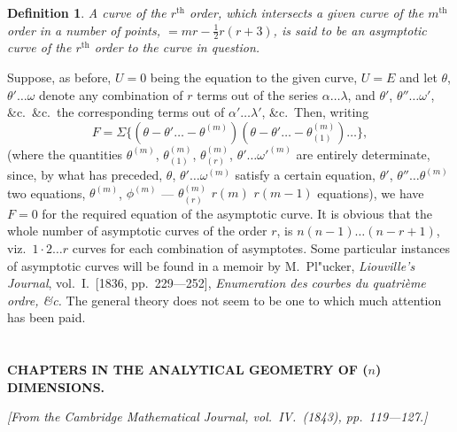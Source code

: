 \documentclass[11pt,a4paper]{book}
\newtheorem*{definition}{Definition}
\begin{document}
\begin{definition}
A curve of the $r^{\text{th}}$ order, which intersects a given curve of the
$m^{\text{th}}$ order in a number of points, $= mr - \tfrac{1}{2}r(r+3)$, is said to be an \textit{asymptotic curve}
of the $r^{\text{th}}$ order to the curve in question.
\end{definition}

Suppose, as before, $U=0$ being the equation to the given curve, $U=E$ and let
$\theta$, $\theta' \ldots \omega$ denote any combination of $r$ terms out of the series $\alpha \ldots \lambda$, and $\theta'$, $\theta'' \ldots \omega'$,
\&c.\ \&c.\ the corresponding terms out of $\alpha' \ldots \lambda'$, \&c.\ Then, writing
\[
F = \Sigma\{(\theta - \theta' \ldots - \theta^{(m)})(\theta - \theta' \ldots - \theta^{(m)}_{(1)}) \ldots\},
\]
(where the quantities $\theta^{(m)}$, $\theta^{(m)}_{(1)}$, $\theta^{(m)}_{(r)}$, $\theta' \ldots \omega'^{(m)}$ are entirely determinate, since, by
what has preceded, $\theta$, $\theta' \ldots \omega^{(m)}$ satisfy a certain equation, $\theta'$, $\theta'' \ldots \theta^{(m)}$ two equations,
$\theta^{(m)}$, $\phi^{(m)}$ --- $\theta^{(m)}_{(r)}$ $r(m)$ $r(m-1)$ equations), we have $F=0$ for the required equation of the
asymptotic curve. It is obvious that the whole number of asymptotic curves of the
order $r$, is $n(n-1) \ldots (n-r+1)$, viz.\ $1 \cdot 2 \ldots r$ curves for each combination of
asymptotes. Some particular instances of asymptotic curves will
be found in a memoir by M.~Pl"{u}cker, \textit{Liouville's Journal}, vol.~I.\ [1836, pp.~229---252],
\textit{Enumeration des courbes du quatri\`{e}me ordre, \&c.} The general theory does not seem to
be one to which much attention has been paid.

\newpage
\setcounter{section}{10}


\section{}
\begin{center}
\textbf{CHAPTERS IN THE ANALYTICAL GEOMETRY OF ($n$) DIMENSIONS.}
\end{center}
\textit{[From the Cambridge Mathematical Journal, vol.\ IV.\ (1843), pp.\ 119---127.]}
\end{document}
